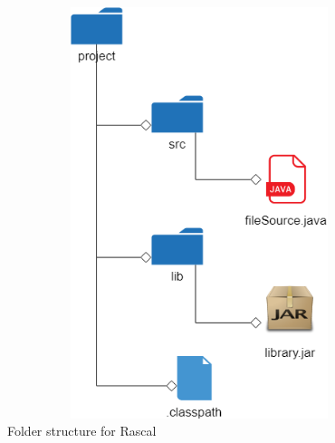 \begin{figure}[H]
\includegraphics[width=12cm,height=12cm,keepaspectratio]{images/Folders.png}
\centering
  \caption{Folder structure for Rascal}
  \label{fig:cmd}
\end{figure}

